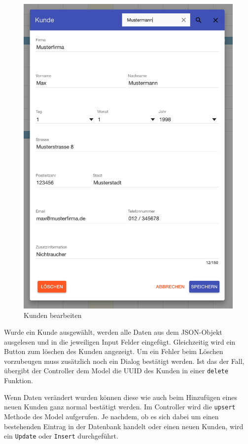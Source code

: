 \begin{figure}[H]
\begin{minipage}[t]{0.49\linewidth}
        \includegraphics[width=\linewidth]{images/frontend_customer_edit.png}
        \caption{Kunden bearbeiten}
        \label{frontend_customer_edit}
    \end{minipage}
\end{figure}

Wurde ein Kunde ausgewählt, werden alle Daten aus dem JSON-Objekt ausgelesen und in die jeweiligen Input Felder eingefügt. Gleichzeitig wird ein Button zum löschen des Kunden angezeigt. Um ein Fehler beim Löschen vorzubeugen muss zusätzlich noch ein Dialog bestätigt werden. Ist das der Fall, übergibt der Controller dem Model die UUID des Kunden in einer \texttt{delete} Funktion. 

Wenn Daten verändert wurden können diese wie auch beim Hinzufügen eines neuen Kunden ganz normal bestätigt werden. Im Controller wird die \texttt{upsert} Methode des Model aufgerufen. Je nachdem, ob es sich dabei um einen bestehenden Eintrag in der Datenbank handelt oder einen neuen Kunden, wird ein \texttt{Update} oder \texttt{Insert} durchgeführt.

